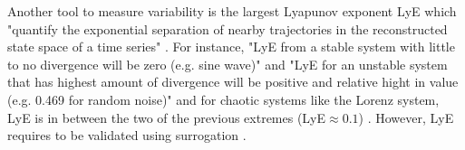 



%
%
%
%
%




Another tool to measure variability is the largest Lyapunov exponent LyE 
which "quantify the exponential separation of nearby trajectories
in the reconstructed state space of a time series" \citep{stergiou2004}.
For instance, "LyE from a stable system with little to no divergence will be zero
(e.g. sine wave)" and "LyE for an unstable system that has highest 
amount of divergence will be positive and relative hight in value
(e.g. 0.469 for random noise)" and for chaotic systems like the Lorenz system,
LyE is in between the two of the previous extremes (LyE$\approx0.1$) \cite[p. 2874]{miller2006}.
However,  LyE requires to be validated using surrogation \citep{dingwell2000, miller2006}.





